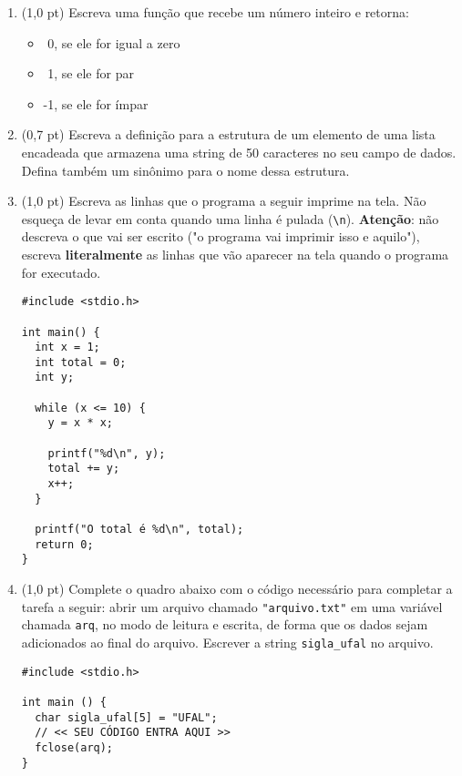 \documentclass[a4paper,10pt]{article}
\begin{document}
\begin{multicols*}{2}
\begin{enumerate}
  \item (1,0 pt) Escreva uma função que recebe um número inteiro e retorna:

  \begin{itemize}
    \item \textcolor{white}{-}0, se ele for igual a zero
    \item \textcolor{white}{-}1, se ele for par
    \item -1, se ele for ímpar
  \end{itemize}

  \item (0,7 pt) Escreva a definição para a estrutura de um elemento de uma lista encadeada que armazena uma string de 50 caracteres no seu campo de dados. Defina também um sinônimo para o nome dessa estrutura.

  \vfill\null
  \columnbreak

  \item (1,0 pt) Escreva as linhas que o programa a seguir imprime na tela. Não esqueça de levar em conta quando uma linha é pulada (\texttt{\textbackslash n}). \textbf{Atenção}: não descreva o que vai ser escrito ("o programa vai imprimir isso e aquilo"), escreva \textbf{literalmente} as linhas que vão aparecer na tela quando o programa for executado.

  \begin{verbatim}
#include <stdio.h>

int main() {
  int x = 1;
  int total = 0;
  int y;

  while (x <= 10) {
    y = x * x;

    printf("%d\n", y);
    total += y;
    x++;
  }

  printf("O total é %d\n", total);
  return 0;
}
  \end{verbatim}

  \item (1,0 pt) Complete o quadro abaixo com o código necessário para completar a tarefa a seguir: abrir um arquivo chamado \texttt{"arquivo.txt"} em uma variável chamada \texttt{arq}, no modo de leitura e escrita, de forma que os dados sejam adicionados ao final do arquivo. Escrever a string \texttt{sigla\_ufal} no arquivo.

  \begin{verbatim}
#include <stdio.h>

int main () {
  char sigla_ufal[5] = "UFAL";
  // << SEU CÓDIGO ENTRA AQUI >>
  fclose(arq);
}
  \end{verbatim}

\end{enumerate}
\end{multicols*}
\end{document}
